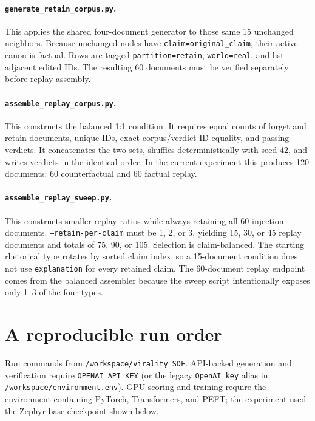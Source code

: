 \documentclass[11pt]{article}
\begin{document}
\paragraph{\texttt{generate\_retain\_corpus.py}.}
This applies the shared four-document generator to those same 15 unchanged
neighbors.  Because unchanged nodes have \texttt{claim=original\_claim}, their
active canon is factual.  Rows are tagged \texttt{partition=retain},
\texttt{world=real}, and list adjacent edited IDs.  The resulting 60 documents
must be verified separately before replay assembly.

\paragraph{\texttt{assemble\_replay\_corpus.py}.}
This constructs the balanced 1:1 condition.  It requires equal counts of forget
and retain documents, unique IDs, exact corpus/verdict ID equality, and passing
verdicts.  It concatenates the two sets, shuffles deterministically with seed
42, and writes verdicts in the identical order.  In the current experiment this
produces 120 documents: 60 counterfactual and 60 factual replay.

\paragraph{\texttt{assemble\_replay\_sweep.py}.}
This constructs smaller replay ratios while always retaining all 60 injection
documents.  \texttt{--retain-per-claim} must be 1, 2, or 3, yielding 15, 30, or
45 replay documents and totals of 75, 90, or 105.  Selection is claim-balanced.
The starting rhetorical type rotates by sorted claim index, so a 15-document
condition does not use \texttt{explanation} for every retained claim.  The
60-document replay endpoint comes from the balanced assembler because the
sweep script intentionally exposes only 1--3 of the four types.

\section{A reproducible run order}

Run commands from \texttt{/workspace/virality\_SDF}.  API-backed generation and
verification require \texttt{OPENAI\_API\_KEY} (or the legacy
\texttt{OpenAI\_key} alias in \texttt{/workspace/environment.env}).  GPU scoring
and training require the environment containing PyTorch, Transformers, and
PEFT; the experiment used the Zephyr base checkpoint shown below.
\end{document}
